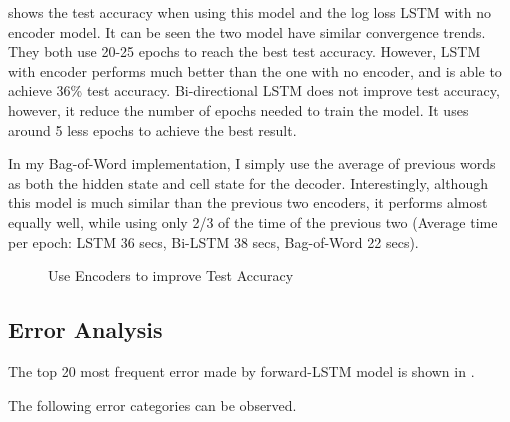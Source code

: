 \documentclass{article}
\begin{document}
 shows the test accuracy when using this model and the log loss LSTM with no encoder model. It can be seen the two model have similar convergence trends. They both use 20-25 epochs to reach the best test accuracy. However, LSTM with encoder performs much better than the one with no encoder, and is able to achieve 36\% test accuracy. Bi-directional LSTM does not improve test accuracy, however, it reduce the number of epochs needed to train the model. It uses around 5 less epochs to achieve the best result. 

In my Bag-of-Word implementation, I simply use the average of previous words as both the hidden state and cell state for the decoder. Interestingly, although this model is much similar than the previous two encoders, it performs almost equally well, while using only 2/3 of the time of the previous two (Average time per epoch: LSTM 36 secs, Bi-LSTM 38 secs, Bag-of-Word 22 secs).
\begin{figure}
\centering
{}
\caption{Use Encoders to improve Test Accuracy}
\label{fig:encoder}
\end{figure}

\subsection{Error Analysis}
The top 20 most frequent error made by forward-LSTM model is shown in .

The following error categories can be observed.
\end{document}
